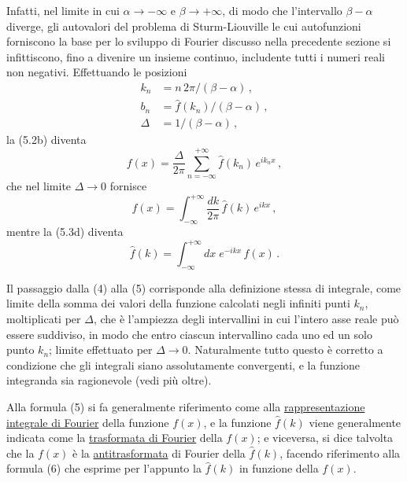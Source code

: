 \documentclass[11pt, a4paper]{book}
\numberwithin{equation}{section}
\begin{document}
Infatti, nel limite in cui $\alpha\to-\infty$ e $\beta\to+\infty$, di modo che l'intervallo $\beta-\alpha$ diverge, gli autovalori del problema di Sturm-Liouville le cui autofunzioni forniscono la base per lo sviluppo di Fourier discusso nella precedente sezione si infittiscono, fino a divenire un insieme continuo, includente tutti i numeri reali non negativi. Effettuando le posizioni
\begin{align}
  k_n &= n\,2\pi/(\beta-\alpha)\,, \tag{1}\\
  b_n &= \hat{f}(k_n)/(\beta-\alpha)\,, \tag{2}\\
  \Delta &= 1/(\beta-\alpha)\,, \tag{3}
\end{align}
la (5.2b) diventa
\begin{equation}
  f(x) = \frac{\Delta}{2\pi}\sum_{n=-\infty}^{+\infty}\hat{f}(k_n)\,e^{ik_n x}\,, \tag{4}
\end{equation}
che nel limite $\Delta\to0$ fornisce
\begin{equation}
  f(x) = \int_{-\infty}^{+\infty}\frac{dk}{2\pi}\,\hat{f}(k)\,e^{ikx}\,, \tag{5}
\end{equation}
mentre la (5.3d) diventa
\begin{equation}
  \hat{f}(k) = \int_{-\infty}^{+\infty} dx\;e^{-ikx}\,f(x)\,. \tag{6}
\end{equation}

Il passaggio dalla (4) alla (5) corrisponde alla definizione stessa di integrale, come limite della somma dei valori della funzione calcolati negli infiniti punti $k_n$, moltiplicati per $\Delta$, che è l'ampiezza degli intervallini in cui l'intero asse reale può essere suddiviso, in modo che entro ciascun intervallino cada uno ed un solo punto $k_n$; limite effettuato per $\Delta\to0$. Naturalmente tutto questo è corretto a condizione che gli integrali siano assolutamente convergenti, e la funzione integranda sia ragionevole (vedi più oltre).

Alla formula (5) si fa generalmente riferimento come alla \uline{rappresentazione integrale di Fourier} della funzione $f(x)$, e la funzione $\hat{f}(k)$ viene generalmente indicata come la \uline{trasformata di Fourier} della $f(x)$; e viceversa, si dice talvolta che la $f(x)$ è la \uline{antitrasformata} di Fourier della $\hat{f}(k)$, facendo riferimento alla formula (6) che esprime per l'appunto la $\hat{f}(k)$ in funzione della $f(x)$.
\end{document}
